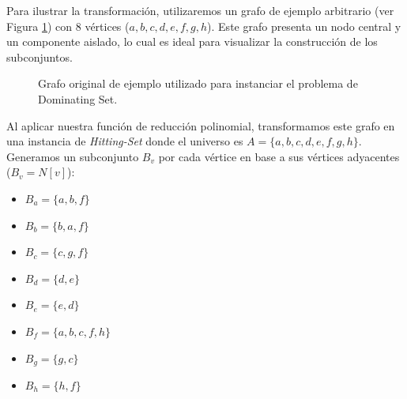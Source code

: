 Para ilustrar la transformación, utilizaremos un grafo de ejemplo arbitrario (ver Figura \ref{fig:grafo_ejemplo}) con 8 vértices ($a, b, c, d, e, f, g, h$). Este grafo presenta un nodo central y un componente aislado, lo cual es ideal para visualizar la construcción de los subconjuntos.

\begin{figure}[htbp]
    \centering
    \caption{Grafo original de ejemplo utilizado para instanciar el problema de Dominating Set.}
    \label{fig:grafo_ejemplo}
\end{figure}

Al aplicar nuestra función de reducción polinomial, transformamos este grafo en una instancia de \textit{Hitting-Set} donde el universo es $A = \{a, b, c, d, e, f, g, h\}$. Generamos un subconjunto $B_v$ por cada vértice en base a sus vértices adyacentes ($B_v = N[v]$):

\begin{itemize}
    \item $B_a = \{a, b, f\}$
    \item $B_b = \{b, a, f\}$
    \item $B_c = \{c, g, f\}$
    \item $B_d = \{d, e\}$
    \item $B_e = \{e, d\}$
    \item $B_f = \{a, b, c, f, h\}$
    \item $B_g = \{g, c\}$
    \item $B_h = \{h, f\}$
\end{itemize}

